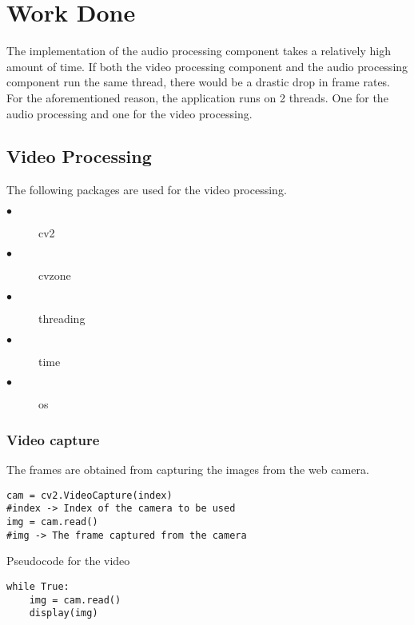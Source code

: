 
\chapter{Work Done} %

\label{ChapterX} %


The implementation of the audio processing component takes a relatively high amount of time. If both the video processing component and the audio processing component run the same thread, there would be a drastic drop in frame rates. For the aforementioned reason, the application runs on 2 threads. One for the audio processing and one for the video processing.

\section{Video Processing}
The following packages are used for the video processing.
\begin{description}
\item[$\bullet$] cv2
\item[$\bullet$] cvzone
\item[$\bullet$] threading
\item[$\bullet$] time
\item[$\bullet$] os
\end{description}
\subsection{Video capture}
The frames are obtained from capturing the images from the web camera.
\begin{lstlisting}[breaklines]
cam = cv2.VideoCapture(index) 
#index -> Index of the camera to be used
img = cam.read()
#img -> The frame captured from the camera
\end{lstlisting}

Pseudocode for the video
\begin{lstlisting}[breaklines]
while True:
	img = cam.read()
	display(img)
\end{lstlisting}

